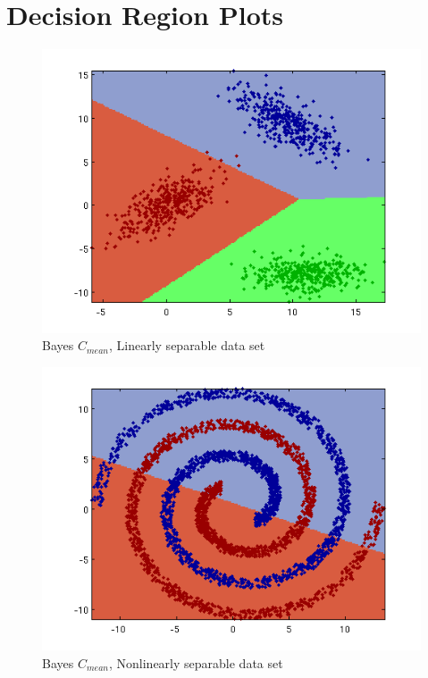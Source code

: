 \documentclass[a4paper]{article}
\begin{document}
\newpage

\section{Decision Region Plots}
\begin{figure}[h]
\center
\includegraphics[clip, trim=40px 15px 30px 10px]{data1a_1a.png}
\caption{Bayes $C_{mean}$, Linearly separable data set}
\end{figure}
\begin{figure}[h]
\center
\includegraphics[clip, trim=40px 15px 30px 10px]{data1b_1a.png}
\caption{Bayes $C_{mean}$, Nonlinearly separable data set}
\end{figure}
\end{document}
